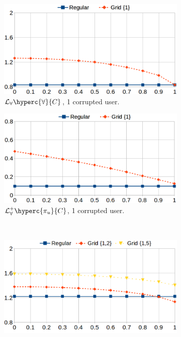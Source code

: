 \begin{figure}[ht]
\centering
\begin{subfigure}[b]{0.45\linewidth}
\includegraphics[width=\textwidth]{figures/crowds-mult-1.png}
\caption{$\mathcal{L}_\forall\hyperc{\forall}{C}$, 1 corrupted user.}
\end{subfigure}
\hfill
\centering
\begin{subfigure}[b]{0.45\linewidth}
\includegraphics[width=\textwidth]{figures/crowds-add-1.png}
\caption{$\mathcal{L}^+_\forall\hyperc{\pi_u}{C}$, 1 corrupted user.}
\end{subfigure}
\\ \vspace{3mm}
\begin{subfigure}[b]{0.45\linewidth}
\includegraphics[width=\textwidth]{figures/crowds-mult-2.png}

\end{subfigure}
\end{figure}
